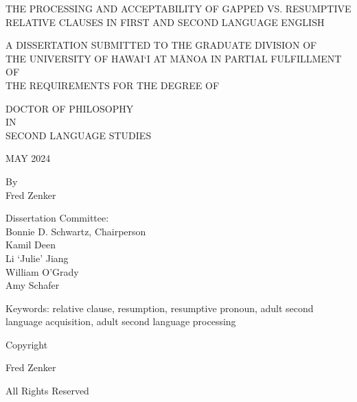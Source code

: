 \documentclass[12pt]{report}
\begin{document}

\centering
\vspace{3cm}

\doublespacing
THE PROCESSING AND ACCEPTABILITY OF GAPPED VS. RESUMPTIVE \\
RELATIVE CLAUSES IN FIRST AND SECOND LANGUAGE ENGLISH

\vspace{1.5cm}
\singlespacing
A DISSERTATION SUBMITTED TO THE GRADUATE DIVISION OF \\
THE UNIVERSITY OF HAWAI`I AT MĀNOA IN PARTIAL FULFILLMENT OF \\
THE REQUIREMENTS FOR THE DEGREE OF

\vspace{1cm}
\doublespacing
DOCTOR OF PHILOSOPHY \\
IN \\
SECOND LANGUAGE STUDIES

\vspace{1.5cm}
\singlespacing
MAY 2024

\vspace{1.5cm}
\doublespacing
By \\
Fred Zenker

\vspace{1.5 cm}
\singlespacing
Dissertation Committee: \\
Bonnie D. Schwartz, Chairperson \\
Kamil Deen \\
Li `Julie' Jiang \\
William O'Grady \\
Amy Schafer

\vspace*{\fill}
\flushleft
Keywords: relative clause, resumption, resumptive pronoun, adult second language acquisition, adult second language processing

\newpage

\setcounter{page}{1}
\vspace*{\fill}
\begin{centering}

Copyright \textcopyright {}

\vspace{0.5 cm}

Fred Zenker

All Rights Reserved

\end{centering}
\end{document}
